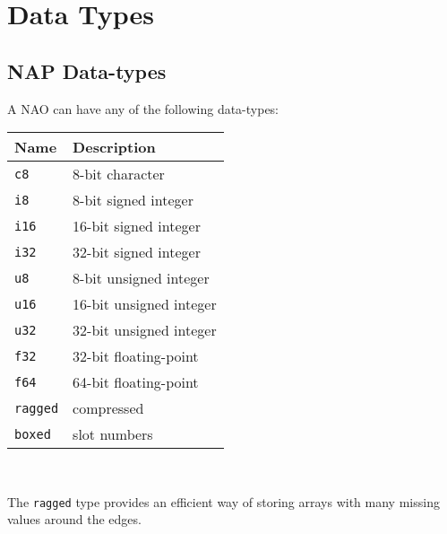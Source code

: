     \section{Data Types}

  \subsection{
    \label{data-types}NAP Data-types
  }
A NAO can have any of the following data-types:
  \\ \par \begin{tabular}{|l|l|}
    \hline 
      \textbf{Name} & 
      \textbf{Description} 
    \\
    \hline 
    \hline 
        \texttt{c8}
       & 
      8-bit character 
    \\
    \hline 
        \texttt{i8}
       & 
      8-bit signed integer
    \\
    \hline 
        \texttt{i16}
       & 
      16-bit signed integer
    \\
    \hline 
        \texttt{i32}
       & 
      32-bit signed integer
    \\
    \hline 
        \texttt{u8}
       & 
      8-bit unsigned integer
    \\
    \hline 
        \texttt{u16}
       & 
      16-bit unsigned integer
    \\
    \hline 
        \texttt{u32}
       & 
      32-bit unsigned integer
    \\
    \hline 
        \texttt{f32}
       & 
      32-bit floating-point
    \\
    \hline 
        \texttt{f64}
       & 
      64-bit floating-point
    \\
    \hline 
        \texttt{ragged}
       & 
      compressed
    \\
    \hline 
        \texttt{boxed}
       & 
      slot numbers
    \\
  \hline
\end{tabular} \\ \par
  

The 
  \texttt{ragged} type provides an efficient way of storing arrays
  with many missing values around the edges.
  

